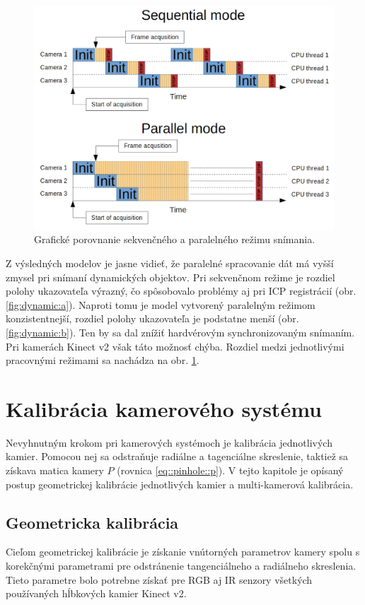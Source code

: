 \begin{figure}[H]
	\centering
	\includegraphics[width=\textwidth]{figures/scanning_mode.png}
	\caption{Grafické porovnanie sekvenčného a paralelného režimu snímania.}
	\label{fig:parallel_sequence}
\end{figure}

Z výsledných modelov je jasne vidieť, že paralelné spracovanie dát má vyšší zmysel pri snímaní dynamických objektov. Pri sekvenčnom režime je rozdiel polohy ukazovateľa výrazný, čo spôsobovalo problémy aj pri ICP registrácií (obr. \ref{fig:dynamic:a}). Naproti tomu je model vytvorený paralelným režimom konzistentnejší, rozdiel polohy ukazovateľa je podstatne menší (obr. \ref{fig:dynamic:b}). Ten by sa dal znížiť hardvérovým synchronizovaným snímaním. Pri kamerách Kinect v2 však táto možnosť chýba. Rozdiel medzi jednotlivými pracovnými režimami sa nachádza na obr. \ref{fig:parallel_sequence}. 

\section{Kalibrácia kamerového systému}
\label{sec:kinect_calib}

Nevyhnutným krokom pri kamerových systémoch je kalibrácia jednotlivých kamier. Pomocou nej sa odstraňuje radiálne a tagenciálne skreslenie, taktiež sa získava matica kamery $P$ (rovnica \ref{eq::pinhole::p}). V tejto kapitole je opísaný postup geometrickej kalibrácie jednotlivých kamier a multi-kamerová kalibrácia. 

\subsection{Geometricka kalibrácia}
Cieľom geometrickej kalibrácie je získanie vnútorných parametrov  kamery spolu s korekčnými parametrami pre odstránenie tangenciálneho a radiálneho skreslenia. Tieto parametre bolo potrebne získať pre RGB aj IR senzory všetkých používaných hĺbkových kamier Kinect v2. 

